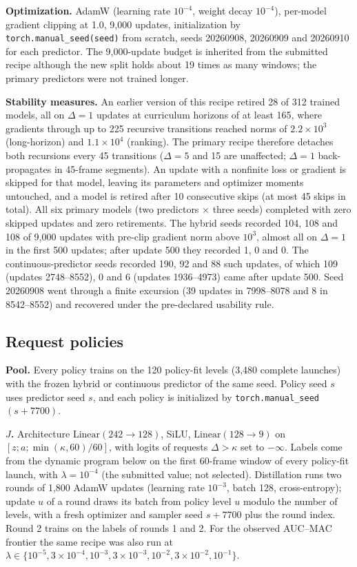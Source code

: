 \begin{revblock}
\textbf{Optimization.} AdamW (learning rate $10^{-4}$, weight decay $10^{-4}$), per-model gradient clipping at 1.0, 9,000 updates, initialization by \texttt{torch.manual\_seed(seed)} from scratch, seeds 20260908, 20260909 and 20260910 for each predictor. The 9,000-update budget is inherited from the submitted recipe although the new split holds about 19 times as many windows; the primary predictors were not trained longer.

\textbf{Stability measures.} An earlier version of this recipe retired 28 of 312 trained models, all on $\Delta=1$ updates at curriculum horizons of at least 165, where gradients through up to 225 recursive transitions reached norms of $2.2\times10^{3}$ (long-horizon) and $1.1\times10^{4}$ (ranking). The primary recipe therefore detaches both recursions every 45 transitions ($\Delta=5$ and 15 are unaffected; $\Delta=1$ back-propagates in 45-frame segments). An update with a nonfinite loss or gradient is skipped for that model, leaving its parameters and optimizer moments untouched, and a model is retired after 10 consecutive skips (at most 45 skips in total). All six primary models (two predictors $\times$ three seeds) completed with zero skipped updates and zero retirements. The hybrid seeds recorded 104, 108 and 108 of 9,000 updates with pre-clip gradient norm above $10^{3}$, almost all on $\Delta=1$ in the first 500 updates; after update 500 they recorded 1, 0 and 0. The continuous-predictor seeds recorded 190, 92 and 88 such updates, of which 109 (updates 2748--8552), 0 and 6 (updates 1936--4973) came after update 500. Seed 20260908 went through a finite excursion (39 updates in 7998--8078 and 8 in 8542--8552) and recovered under the pre-declared usability rule.

\subsection{Request policies}

\textbf{Pool.} Every policy trains on the 120 policy-fit levels (3,480 complete launches) with the frozen hybrid or continuous predictor of the same seed. Policy seed $s$ uses predictor seed $s$, and each policy is initialized by \texttt{torch.manual\_seed}$(s+7700)$.

\textbf{$J$.} Architecture $\mathrm{Linear}(242\to128)$, SiLU, $\mathrm{Linear}(128\to9)$ on $[z;a;\min(\kappa,60)/60]$, with logits of requests $\Delta>\kappa$ set to $-\infty$. Labels come from the dynamic program below on the first 60-frame window of every policy-fit launch, with $\lambda=10^{-4}$ (the submitted value; not selected). Distillation runs two rounds of 1,800 AdamW updates (learning rate $10^{-3}$, batch 128, cross-entropy); update $u$ of a round draws its batch from policy level $u$ modulo the number of levels, with a fresh optimizer and sampler seed $s+7700$ plus the round index. Round 2 trains on the labels of rounds 1 and 2. For the observed AUC--MAC frontier the same recipe was also run at $\lambda\in\{10^{-5},3\times10^{-4},10^{-3},3\times10^{-3},10^{-2},3\times10^{-2},10^{-1}\}$.


\end{revblock}
